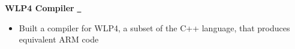 \textbf{WLP4 Compiler} \href{https://gitfront.io/r/ininicho/pjpiqr4YskSL/compiler/}{\github\ } \par
\begin{itemize}
	\item Built a compiler for WLP4, a subset of the C++ language, that produces equivalent ARM code
\end{itemize}
\vspace{0.1cm} \par
